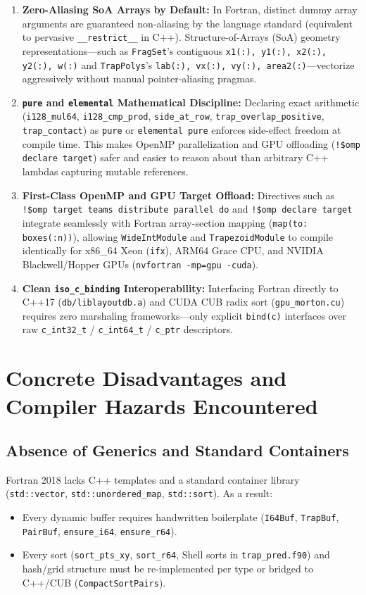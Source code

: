 \begin{enumerate}
  \item \textbf{Zero-Aliasing SoA Arrays by Default:} In Fortran, distinct dummy array arguments are guaranteed non-aliasing by the language standard (equivalent to pervasive \texttt{\_\_restrict\_\_} in C++). Structure-of-Arrays (SoA) geometry representations---such as \texttt{FragSet}'s contiguous \texttt{x1(:), y1(:), x2(:), y2(:), w(:)} and \texttt{TrapPolys}'s \texttt{lab(:), vx(:), vy(:), area2(:)}---vectorize aggressively without manual pointer-aliasing pragmas.
  \item \textbf{\texttt{pure} and \texttt{elemental} Mathematical Discipline:} Declaring exact arithmetic (\texttt{i128\_mul64}, \texttt{i128\_cmp\_prod}, \texttt{side\_at\_row}, \texttt{trap\_overlap\_positive}, \texttt{trap\_contact}) as \texttt{pure} or \texttt{elemental pure} enforces side-effect freedom at compile time. This makes OpenMP parallelization and GPU offloading (\texttt{!\$omp declare target}) safer and easier to reason about than arbitrary C++ lambdas capturing mutable references.
  \item \textbf{First-Class OpenMP and GPU Target Offload:} Directives such as \texttt{!\$omp target teams distribute parallel do} and \texttt{!\$omp declare target} integrate seamlessly with Fortran array-section mapping (\texttt{map(to: boxes(:n))}), allowing \texttt{WideIntModule} and \texttt{TrapezoidModule} to compile identically for x86\_64 Xeon (\texttt{ifx}), ARM64 Grace CPU, and NVIDIA Blackwell/Hopper GPUs (\texttt{nvfortran -mp=gpu -cuda}).
  \item \textbf{Clean \texttt{iso\_c\_binding} Interoperability:} Interfacing Fortran directly to C++17 (\texttt{db/liblayoutdb.a}) and CUDA CUB radix sort (\texttt{gpu\_morton.cu}) requires zero marshaling frameworks---only explicit \texttt{bind(c)} interfaces over raw \texttt{c\_int32\_t} / \texttt{c\_int64\_t} / \texttt{c\_ptr} descriptors.
\end{enumerate}

\section{Concrete Disadvantages and Compiler Hazards Encountered}

\subsection{Absence of Generics and Standard Containers}
Fortran 2018 lacks C++ templates and a standard container library (\texttt{std::vector}, \texttt{std::unordered\_map}, \texttt{std::sort}). As a result:
\begin{itemize}
  \item Every dynamic buffer requires handwritten boilerplate (\texttt{I64Buf}, \texttt{TrapBuf}, \texttt{PairBuf}, \texttt{ensure\_i64}, \texttt{ensure\_r64}).
  \item Every sort (\texttt{sort\_pts\_xy}, \texttt{sort\_r64}, Shell sorts in \texttt{trap\_pred.f90}) and hash/grid structure must be re-implemented per type or bridged to C++/CUB (\texttt{CompactSortPairs}).
\end{itemize}

